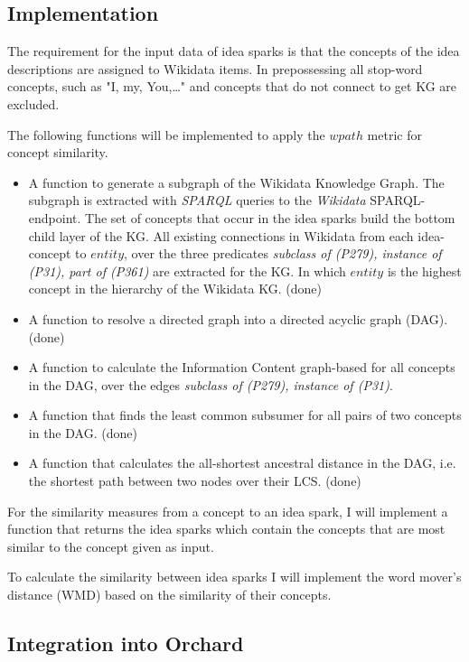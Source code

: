 \documentclass[pdftex,a4paper,12pt]{scrartcl}
\theoremstyle{definition}
\begin{document}
    \subsection{Implementation}
    
    The requirement for the input data of idea sparks is that the concepts of the idea descriptions are assigned to Wikidata items. In prepossessing all stop-word concepts, such as "I, my, You,\dots" and concepts that do not connect to get KG are excluded.
    
    The following functions will be implemented to apply the $wpath$ metric for concept similarity.
    \begin{itemize}
        \item A function to generate a subgraph of the Wikidata Knowledge Graph.
        The subgraph is extracted with \textit{SPARQL} queries to the \textit{Wikidata} SPARQL-endpoint. The set of concepts that occur in the idea sparks build the bottom child layer of the KG. All existing connections in Wikidata from each idea-concept to $entity$, over the three predicates \textit{subclass of (P279), instance of (P31), part of (P361)} are extracted for the KG. In which $entity$ is the highest concept in the hierarchy of the Wikidata KG. (done)
        \item A function to resolve a directed graph into a directed acyclic graph (DAG). (done)
        \item A function to calculate the Information Content graph-based for all concepts in the DAG, over the edges \textit{subclass of (P279), instance of (P31)}. 
        \item A function that finds the least common subsumer for all pairs of two concepts in the DAG. (done)
        \item A function that calculates the all-shortest ancestral distance in the DAG, i.e. the shortest path between two nodes over their LCS. (done)
    \end{itemize}
    
    For the similarity measures from a concept to an idea spark, I will implement a function that returns the idea sparks which contain the concepts that are most similar to the concept given as input. 
    
    To calculate the similarity between idea sparks I will implement the word mover's distance (WMD) \citep{kusner_word_2015} based on the similarity of their concepts. 
    
    \subsection{Integration into Orchard}
    
\end{document}
